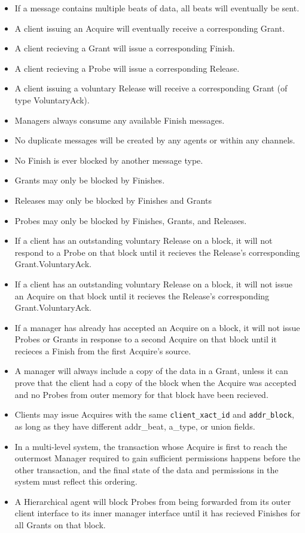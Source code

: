 \begin{itemize}
\item If a message contains multiple beats of data, all beats will eventually be sent.
\item A client issuing an Acquire will eventually receive a corresponding Grant.
\item A client recieving a Grant will issue a corresponding Finish.
\item A client recieving a Probe will issue a corresponding Release.
\item A client issuing a voluntary Release will receive a corresponding Grant (of type VoluntaryAck).
\item Managers always consume any available Finish messages.
\item No duplicate messages will be created by any agents or within any channels.
\item No Finish is ever blocked by another message type.
\item Grants may only be blocked by Finishes.
\item Releases may only be blocked by Finishes and Grants
\item Probes may only be blocked by Finishes, Grants, and Releases.
\item If a client has an outstanding voluntary Release on a block, it will not respond to a Probe on that block until it recieves the Release's corresponding Grant.VoluntaryAck.
\item If a client has an outstanding voluntary Release on a block, it will not issue an Acquire on that block until it recieves the Release's corresponding Grant.VoluntaryAck.
\item If a manager has already has accepted an Acquire on a block, it will not issue Probes or Grants in response to a second Acquire on that block until it recieces a Finish from the first Acquire's source.
\item A manager will always include a copy of the data in a Grant, unless it can prove that the client had a copy of the block when the Acquire was accepted and no Probes from outer memory for that block have been recieved.
\item Clients may issue Acquires with the same {\tt client\_xact\_id} and {\tt addr\_block}, as long as they have different {addr\_beat}, {a\_type}, or {union} fields.
\item In a multi-level system, the transaction whose Acquire is first to reach the outermost Manager required to gain sufficient permissions happens before the other transaction,
and the final state of the data and permissions in the system must reflect this ordering.
\item A Hierarchical agent will block Probes from being forwarded from its outer client interface to its inner manager interface until it has recieved Finishes for all Grants on that block.
\end{itemize}

